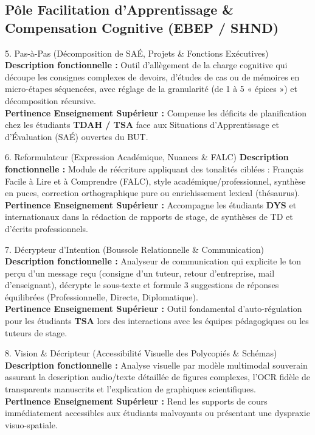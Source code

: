 \documentclass[11pt,a4paper]{article}
\begin{document}
\subsection{Pôle Facilitation d'Apprentissage \& Compensation Cognitive (EBEP / SHND)}

\begin{featureBox}[amberOrange]{5. Pas-à-Pas (Décomposition de SAÉ, Projets \& Fonctions Exécutives)}
\textbf{Description fonctionnelle :} Outil d'allègement de la charge cognitive qui découpe les consignes complexes de devoirs, d'études de cas ou de mémoires en micro-étapes séquencées, avec réglage de la granularité (de 1 à 5 « épices ») et décomposition récursive.\\
\textbf{Pertinence Enseignement Supérieur :} Compense les déficits de planification chez les étudiants \textbf{TDAH / TSA} face aux Situations d'Apprentissage et d'Évaluation (SAÉ) ouvertes du BUT.
\end{featureBox}

\begin{featureBox}[emeraldGreen]{6. Reformulateur (Expression Académique, Nuances \& FALC)}
\textbf{Description fonctionnelle :} Module de réécriture appliquant des tonalités ciblées : Français Facile à Lire et à Comprendre (FALC), style académique/professionnel, synthèse en puces, correction orthographique pure ou enrichissement lexical (thésaurus).\\
\textbf{Pertinence Enseignement Supérieur :} Accompagne les étudiants \textbf{DYS} et internationaux dans la rédaction de rapports de stage, de synthèses de TD et d'écrits professionnels.
\end{featureBox}

\begin{featureBox}[univBlue]{7. Décrypteur d'Intention (Boussole Relationnelle \& Communication)}
\textbf{Description fonctionnelle :} Analyseur de communication qui explicite le ton perçu d'un message reçu (consigne d'un tuteur, retour d'entreprise, mail d'enseignant), décrypte le sous-texte et formule 3 suggestions de réponses équilibrées (Professionnelle, Directe, Diplomatique).\\
\textbf{Pertinence Enseignement Supérieur :} Outil fondamental d'auto-régulation pour les étudiants \textbf{TSA} lors des interactions avec les équipes pédagogiques ou les tuteurs de stage.
\end{featureBox}

\begin{featureBox}[primaryRed]{8. Vision \& Décripteur (Accessibilité Visuelle des Polycopiés \& Schémas)}
\textbf{Description fonctionnelle :} Analyse visuelle par modèle multimodal souverain assurant la description audio/texte détaillée de figures complexes, l'OCR fidèle de transparents manuscrits et l'explication de graphiques scientifiques.\\
\textbf{Pertinence Enseignement Supérieur :} Rend les supports de cours immédiatement accessibles aux étudiants malvoyants ou présentant une dyspraxie visuo-spatiale.
\end{featureBox}
\end{document}
